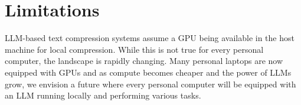 \documentclass[11pt]{article}
\begin{document}
\section{Limitations}
LLM-based text compression systems assume a GPU being available in the host machine for local compression. While this is not true for every personal computer, the landscape is rapidly changing. Many personal laptops are now equipped with GPUs and as compute becomes cheaper and the power of LLMs grow, we envision a future where every personal computer will be equipped with an LLM running locally and performing various tasks.






\end{document}
